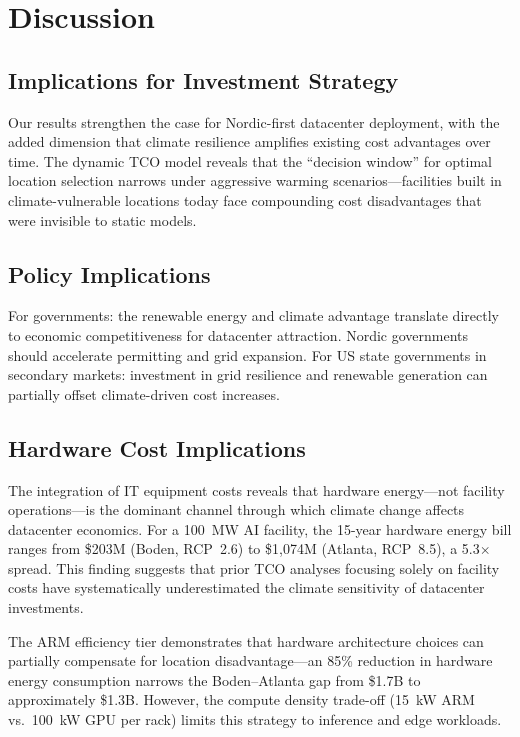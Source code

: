 \documentclass[12pt,a4paper]{article}
\begin{document}
\section{Discussion}
\label{sec:discussion}

\subsection{Implications for Investment Strategy}

Our results strengthen the case for Nordic-first datacenter deployment, with the added dimension that climate resilience amplifies existing cost advantages over time. The dynamic TCO model reveals that the ``decision window'' for optimal location selection narrows under aggressive warming scenarios—facilities built in climate-vulnerable locations today face compounding cost disadvantages that were invisible to static models.

\subsection{Policy Implications}

For governments: the renewable energy and climate advantage translate directly to economic competitiveness for datacenter attraction. Nordic governments should accelerate permitting and grid expansion. For US state governments in secondary markets: investment in grid resilience and renewable generation can partially offset climate-driven cost increases.

\subsection{Hardware Cost Implications}

The integration of IT equipment costs reveals that hardware energy—not facility operations—is the dominant channel through which climate change affects datacenter economics. For a 100~MW AI facility, the 15-year hardware energy bill ranges from \$203M (Boden, RCP~2.6) to \$1,074M (Atlanta, RCP~8.5), a 5.3$\times$ spread. This finding suggests that prior TCO analyses focusing solely on facility costs have systematically underestimated the climate sensitivity of datacenter investments.

The ARM efficiency tier demonstrates that hardware architecture choices can partially compensate for location disadvantage—an 85\% reduction in hardware energy consumption narrows the Boden--Atlanta gap from \$1.7B to approximately \$1.3B. However, the compute density trade-off (15~kW ARM vs.\ 100~kW GPU per rack) limits this strategy to inference and edge workloads.
\end{document}

